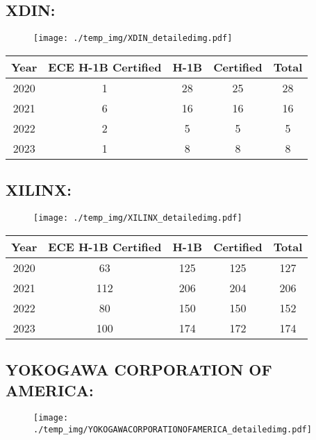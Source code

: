 \documentclass{article}%
\begin{document}
%
\newpage%
\subsection{XDIN:}%
\label{subsec:XDIN}%
\label{XDINdetailed}%


\begin{figure}[htbp]%
\centering%
\texttt{[image: ./temp\_img/XDIN\_detailedimg.pdf]}%
\end{figure}

%
\begin{longtable}{c|c|c|c|c}%
\hline%
Year&ECE H{-}1B Certified&H{-}1B&Certified&Total\\%
\hline%
2020&1&28&25&28\\%
\hline%
2021&6&16&16&16\\%
\hline%
2022&2&5&5&5\\%
\hline%
2023&1&8&8&8\\%
\hline%
\end{longtable}

%
\newpage%
\subsection{XILINX:}%
\label{subsec:XILINX}%
\label{XILINXdetailed}%


\begin{figure}[htbp]%
\centering%
\texttt{[image: ./temp\_img/XILINX\_detailedimg.pdf]}%
\end{figure}

%
\begin{longtable}{c|c|c|c|c}%
\hline%
Year&ECE H{-}1B Certified&H{-}1B&Certified&Total\\%
\hline%
2020&63&125&125&127\\%
\hline%
2021&112&206&204&206\\%
\hline%
2022&80&150&150&152\\%
\hline%
2023&100&174&172&174\\%
\hline%
\end{longtable}

%
\newpage%
\subsection{YOKOGAWA CORPORATION OF AMERICA:}%
\label{subsec:YOKOGAWACORPORATIONOFAMERICA}%
\label{YOKOGAWACORPORATIONOFAMERICAdetailed}%


\begin{figure}[htbp]%
\centering%
\texttt{[image: ./temp\_img/YOKOGAWACORPORATIONOFAMERICA\_detailedimg.pdf]}%
\end{figure}
\end{document}
